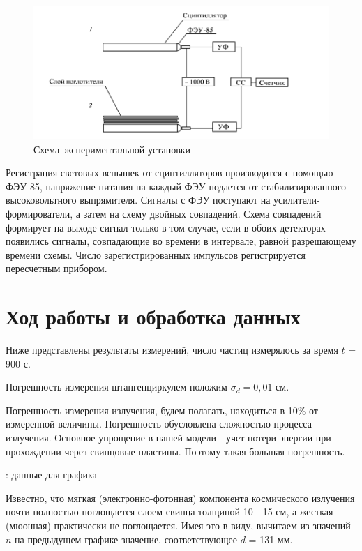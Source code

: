 \documentclass[15pt,a5paper,reqno]{article}
\begin{document}
\begin{figure}[h]
    \centering
    \includegraphics[width=1.0\linewidth]{pics/scheme.png}
    \caption{Схема экспериментальной установки}
    \label{scheme}
\end{figure}    


Регистрация световых вспышек от сцинтилляторов производится с помощью ФЭУ-85,
напряжение питания на каждый ФЭУ подается от стабилизированного высоковольтного
выпрямителя. Сигналы с ФЭУ поступают на усилители-формирователи, а затем на схему
двойных совпадений. Схема совпадений формирует на выходе сигнал только в том
случае, если в обоих детекторах появились сигналы, совпадающие во времени в
интервале, равной разрешающему времени схемы. Число зарегистрированных импульсов
регистрируется пересчетным прибором.


\section{Ход работы и обработка данных}

Ниже представлены результаты измерений, число частиц измерялось за время $t$ = 900 с.

Погрешность измерения штангенциркулем положим $\sigma_{d} = 0,01 \text{ см}$.

Погрешность измерения излучения, будем полагать, находиться в 10\% от измеренной величины. Погрешность обусловлена сложностью процесса излучения. Основное упрощение в нашей модели - учет потери энергии при прохождении через свинцовые пластины.
Поэтому такая большая погрешность. 

\begin{table}[h!]
    \centering
    
    \caption{: данные для графика}
\label{tb1}
\end{table}

Известно, что мягкая (электронно-фотонная) компонента космического излучения почти
полностью поглощается слоем свинца толщиной 10 - 15 см, а жесткая (мюонная)
практически не поглощается. Имея это в виду, вычитаем из значений $n$ на предыдущем
графике значение, соответствующее $d$ = 131 мм.
\end{document}
